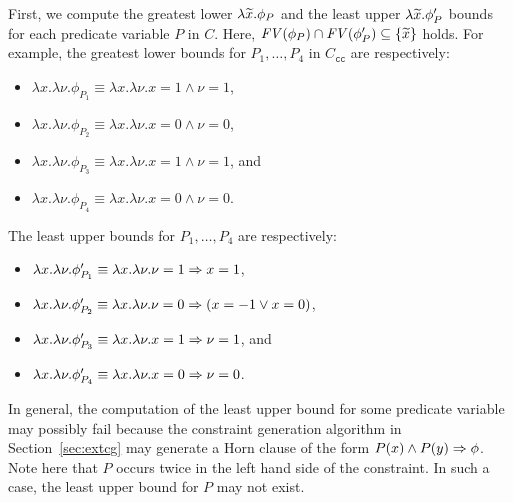 %
First, we compute the greatest lower \(\lambda \widetilde{x}.\phi_P\) and the 
least upper \(\lambda \widetilde{x}.\phi_P'\) bounds for each predicate 
variable \(P\) in \(C\).  Here, \(\mathit{FV}({\phi_P}) \cap \mathit{FV}({\phi_P'}) 
\subseteq \{{\widetilde{x}}\}\) holds.  For example, the greatest lower bounds 
for \(P_1,\dots,P_4\) in \(C_{\texttt{cc}}\) are respectively:
\begin{itemize}
\item \(\lambda x.\lambda \nu.\phi_{P_1}\equiv \lambda x.\lambda \nu.x=1 \land \nu=1\),
\item \(\lambda x.\lambda \nu.\phi_{P_2}\equiv \lambda x.\lambda \nu.x=0 \land \nu=0\),
\item \(\lambda x.\lambda \nu.\phi_{P_3}\equiv \lambda x.\lambda \nu.x=1 \land \nu=1\), and
\item \(\lambda x.\lambda \nu.\phi_{P_4}\equiv \lambda x.\lambda \nu.x=0 \land \nu=0\).
\end{itemize}
The least upper bounds for \(P_1,\dots,P_4\) are respectively:
\begin{itemize}
\item \(\lambda x.\lambda \nu.\phi_{P_1}'\equiv \lambda x.\lambda \nu.\nu=1 \Rightarrow x=1\),
\item \(\lambda x.\lambda \nu.\phi_{P_2}'\equiv \lambda x.\lambda \nu.\nu=0 \Rightarrow (x=-1 \lor x=0)\),
\item \(\lambda x.\lambda \nu.\phi_{P_3}'\equiv \lambda x.\lambda \nu.x=1 \Rightarrow \nu=1\), and
\item \(\lambda x.\lambda \nu.\phi_{P_4}'\equiv \lambda x.\lambda \nu.x=0 \Rightarrow \nu=0\).
\end{itemize}

In general, the computation of the least upper bound for some predicate 
variable may possibly fail because the constraint generation algorithm 
in Section~\ref{sec:extcg} may generate a Horn clause of the form 
\(P(x)\land P(y) \Rightarrow \phi\).  Note here that \(P\) occurs twice in 
the left hand side of the constraint.  In such a case, the least upper 
bound for \(P\) may not exist.

